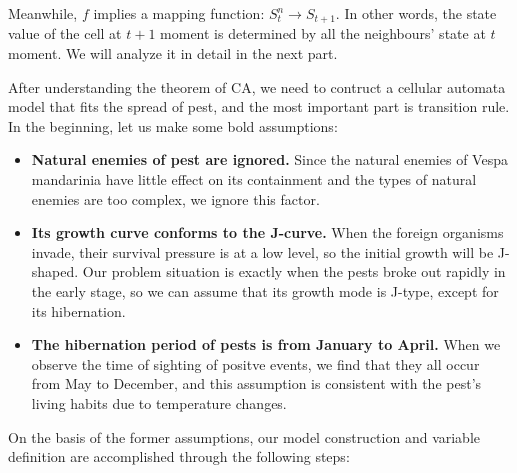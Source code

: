 Meanwhile, $f$ implies a mapping function: $S^n_t \xrightarrow{} S_{t+1}$. In other words, the state value of the cell at $t+1$ moment is determined by all the neighbours' state at $t$ moment. We will analyze it in detail in the next part.

After understanding the theorem of CA, we need to contruct a cellular automata model that fits the spread of pest, and the most important part is transition rule. In the beginning, let us make some bold assumptions:

\begin{itemize}
    \item \textbf{Natural enemies of pest are ignored.} Since the natural enemies of Vespa mandarinia have little effect on its containment and the types of natural enemies are too complex, we ignore this factor.
    \item \textbf{Its growth curve conforms to the J-curve.} When the foreign organisms invade, their survival pressure is at a low level, so the initial growth will be J-shaped. Our problem situation is exactly when the pests broke out rapidly in the early stage, so we can assume that its growth mode is J-type, except for its hibernation.%
    \item \textbf{The hibernation period of pests is from January to April.} When we observe the time of sighting of positve events, we find that they all occur from May to December, and this assumption is consistent with the pest’s living habits due to temperature changes.
\end{itemize}

On the basis of the former assumptions, our model construction and variable definition are accomplished through the following steps:

